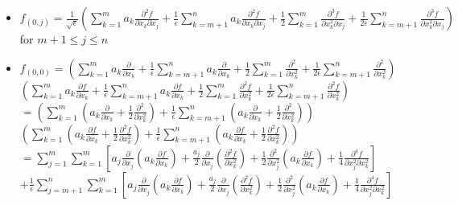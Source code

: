 \documentclass[12pt]{article}
\begin{document}
\begin{itemize}
\item $f_{(0, j)} = \frac{1}{\sqrt{\epsilon}}  \left(\sum_{k=1}^m a_k \frac{\partial^2 f}{\partial x_k \partial x_j} 
+ \frac{1}{\epsilon} \sum_{k=m+1}^n a_k \frac{\partial^2 f}{\partial x_k \partial x_j} 
 + \frac{1}{2} \sum_{k=1}^m \frac{\partial^3 f}{\partial x_k^2 \partial x_j} 
 +\frac{1}{2 \epsilon} \sum_{k=m+1}^n \frac{\partial^3 f}{\partial x_k^2 \partial x_j} \right)$ for $m+1 \le j \le n$
%
\item $f_{(0,0)} = \left(\sum_{k=1}^m a_k \frac{\partial}{\partial x_k} 
+ \frac{1}{\epsilon} \sum_{k=m+1}^n a_k \frac{\partial}{\partial x_k} 
+ \frac{1}{2} \sum_{k=1}^m \frac{\partial^2}{\partial x_k^2} 
+ \frac{1}{2 \epsilon} \sum_{k=m+1}^n \frac{\partial^2}{\partial x_k^2} \right) $\\
$ \left(\sum_{k=1}^m a_k \frac{\partial f}{\partial x_k} 
+ \frac{1}{\epsilon} \sum_{k=m+1}^n a_k \frac{\partial f}{\partial x_k} 
+ \frac{1}{2} \sum_{k=1}^m \frac{\partial^2 f}{\partial x_k^2} 
+ \frac{1}{2 \epsilon} \sum_{k=m+1}^n \frac{\partial^2 f}{\partial x_k^2} \right)$ \\
$= \left(\sum_{k=1}^m \left( a_k \frac{\partial}{\partial x_k} + \frac{1}{2} \frac{\partial^2}{\partial x_k^2} \right) 
+ \frac{1}{\epsilon} \sum_{k=m+1}^n \left( a_k \frac{\partial}{\partial x_k} + \frac{1}{2} \frac{\partial^2}{\partial x_k^2}  \right) \right) $\\
$ \left(\sum_{k=1}^m \left( a_k \frac{\partial f}{\partial x_k} + \frac{1}{2} \frac{\partial^2 f}{\partial x_k^2} \right) 
+ \frac{1}{\epsilon} \sum_{k=m+1}^n \left( a_k \frac{\partial f}{\partial x_k} + \frac{1}{2} \frac{\partial^2 f}{\partial x_k^2}  \right) \right) $ \\
$ = \sum_{j=1}^m \sum_{k=1}^m \left[ a_j \frac{\partial}{\partial x_j} \left( a_k \frac{\partial f}{\partial x_k} \right) + \frac{a_j}{2} \frac{\partial}{\partial x_j} \left( \frac{\partial^2 f}{\partial x_k^2} \right) + \frac{1}{2} \frac{\partial^2}{\partial x_j^2} \left( a_k \frac{\partial f}{\partial x_k} \right) + \frac{1}{4} \frac{\partial^4 f}{\partial x_j^2 \partial x_k^2} \right] $\\
$+ \frac{1}{\epsilon} \sum_{j=m+1}^n \sum_{k=1}^m \left[ a_j \frac{\partial}{\partial x_j} \left( a_k \frac{\partial f}{\partial x_k} \right) + \frac{a_j}{2} \frac{\partial}{\partial x_j} \left( \frac{\partial^2 f}{\partial x_k^2} \right) + \frac{1}{2} \frac{\partial^2}{\partial x_j^2} \left( a_k \frac{\partial f}{\partial x_k} \right) + \frac{1}{4} \frac{\partial^4 f}{\partial x_j^2 \partial x_k^2} \right] $\\

\end{itemize}
\end{document}
